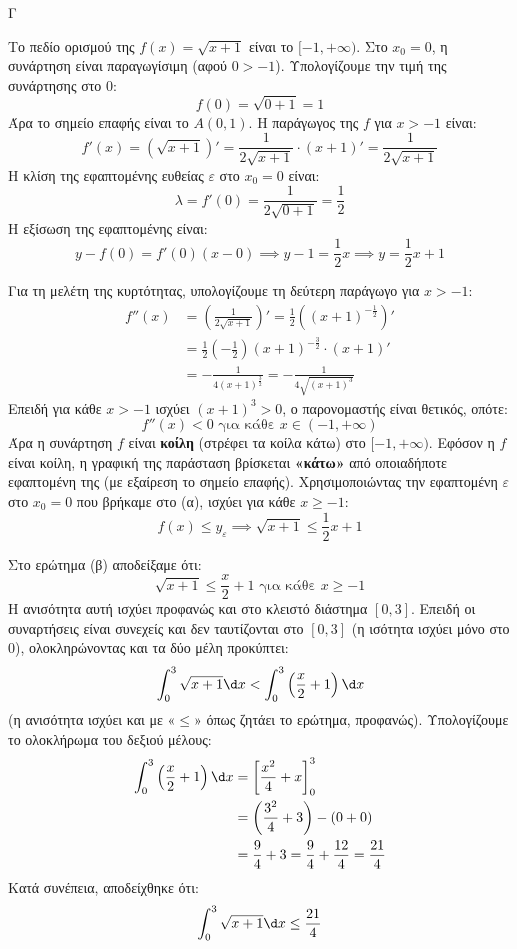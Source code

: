 \begin{thema}{Γ}
\begin{erwthma}
\item Το πεδίο ορισμού της $f(x) = \sqrt{x+1}$ είναι το $[-1, +\infty)$. Στο $x_0 = 0$, η συνάρτηση είναι παραγωγίσιμη (αφού $0 > -1$). 
Υπολογίζουμε την τιμή της συνάρτησης στο $0$:
\[ f(0) = \sqrt{0+1} = 1 \]
Άρα το σημείο επαφής είναι το $A(0, 1)$.
Η παράγωγος της $f$ για $x > -1$ είναι:
\[ f'(x) = (\sqrt{x+1})' = \frac{1}{2\sqrt{x+1}} \cdot (x+1)' = \frac{1}{2\sqrt{x+1}} \]
Η κλίση της εφαπτομένης ευθείας $\varepsilon$ στο $x_0 = 0$ είναι:
\[ \lambda = f'(0) = \frac{1}{2\sqrt{0+1}} = \frac{1}{2} \]
Η εξίσωση της εφαπτομένης είναι:
\[ y - f(0) = f'(0)(x - 0) \implies y - 1 = \frac{1}{2}x \implies y = \frac{1}{2}x + 1 \]

\item Για τη μελέτη της κυρτότητας, υπολογίζουμε τη δεύτερη παράγωγο για $x > -1$:
\begin{align*}
f''(x) &= \left( \frac{1}{2\sqrt{x+1}} \right)' = \frac{1}{2} \left( (x+1)^{-\frac{1}{2}} \right)' \\
&= \frac{1}{2} \left( -\frac{1}{2} \right) (x+1)^{-\frac{3}{2}} \cdot (x+1)' \\
&= -\frac{1}{4(x+1)^{\frac{3}{2}}} = -\frac{1}{4\sqrt{(x+1)^3}}
\end{align*}
Επειδή για κάθε $x > -1$ ισχύει $(x+1)^3 > 0$, ο παρονομαστής είναι θετικός, οπότε:
\[ f''(x) < 0 \text{ για κάθε } x \in (-1, +\infty) \]
Άρα η συνάρτηση $f$ είναι \textbf{κοίλη} (στρέφει τα κοίλα κάτω) στο $[-1, +\infty)$.
Εφόσον η $f$ είναι κοίλη, η γραφική της παράσταση βρίσκεται \textbf{«κάτω»} από οποιαδήποτε εφαπτομένη της (με εξαίρεση το σημείο επαφής).
Χρησιμοποιώντας την εφαπτομένη $\varepsilon$ στο $x_0 = 0$ που βρήκαμε στο (α), ισχύει για κάθε $x \ge -1$:
\[ f(x) \le y_{\varepsilon} \implies \sqrt{x+1} \le \frac{1}{2}x + 1 \]

\item Στο ερώτημα (β) αποδείξαμε ότι:
\[ \sqrt{x+1} \le \frac{x}{2} + 1 \text{ για κάθε } x \ge -1 \]
Η ανισότητα αυτή ισχύει προφανώς και στο κλειστό διάστημα $[0, 3]$. 
Επειδή οι συναρτήσεις είναι συνεχείς και δεν ταυτίζονται στο $[0,3]$ (η ισότητα ισχύει μόνο στο $0$), ολοκληρώνοντας και τα δύο μέλη προκύπτει:
\[ \int_{0}^{3} \sqrt{x+1} \d x < \int_{0}^{3} \left( \frac{x}{2} + 1 \right) \d x \]
(η ανισότητα ισχύει και με «$\le$» όπως ζητάει το ερώτημα, προφανώς).
Υπολογίζουμε το ολοκλήρωμα του δεξιού μέλους:
\begin{align*}
\int_{0}^{3} \left( \frac{x}{2} + 1 \right) \d x &= \left[ \frac{x^2}{4} + x \right]_{0}^{3} \\
&= \left( \frac{3^2}{4} + 3 \right) - (0 + 0) \\
&= \frac{9}{4} + 3 = \frac{9}{4} + \frac{12}{4} = \frac{21}{4}
\end{align*}
Κατά συνέπεια, αποδείχθηκε ότι:
\[ \int_{0}^{3} \sqrt{x+1} \d x \le \frac{21}{4} \]


\end{erwthma}
\end{thema}
